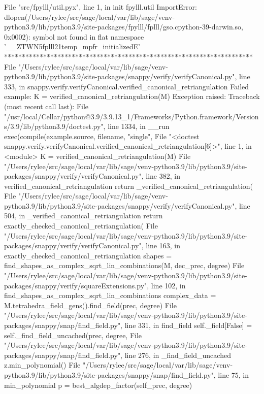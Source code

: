       File "src/fpylll/util.pyx", line 1, in init fpylll.util
    ImportError: dlopen(/Users/rylee/src/sage/local/var/lib/sage/venv-python3.9/lib/python3.9/site-packages/fpylll/fplll/gso.cpython-39-darwin.so, 0x0002): symbol not found in flat namespace '__ZTWN5fplll21temp_mpfr_initializedE'
**********************************************************************
File "/Users/rylee/src/sage/local/var/lib/sage/venv-python3.9/lib/python3.9/site-packages/snappy/verify/verifyCanonical.py", line 333, in snappy.verify.verifyCanonical.verified_canonical_retriangulation
Failed example:
    K = verified_canonical_retriangulation(M)
Exception raised:
    Traceback (most recent call last):
      File "/usr/local/Cellar/python@3.9/3.9.13_1/Frameworks/Python.framework/Versions/3.9/lib/python3.9/doctest.py", line 1334, in __run
        exec(compile(example.source, filename, "single",
      File "<doctest snappy.verify.verifyCanonical.verified_canonical_retriangulation[6]>", line 1, in <module>
        K = verified_canonical_retriangulation(M)
      File "/Users/rylee/src/sage/local/var/lib/sage/venv-python3.9/lib/python3.9/site-packages/snappy/verify/verifyCanonical.py", line 382, in verified_canonical_retriangulation
        return _verified_canonical_retriangulation(
      File "/Users/rylee/src/sage/local/var/lib/sage/venv-python3.9/lib/python3.9/site-packages/snappy/verify/verifyCanonical.py", line 504, in _verified_canonical_retriangulation
        return exactly_checked_canonical_retriangulation(
      File "/Users/rylee/src/sage/local/var/lib/sage/venv-python3.9/lib/python3.9/site-packages/snappy/verify/verifyCanonical.py", line 163, in exactly_checked_canonical_retriangulation
        shapes = find_shapes_as_complex_sqrt_lin_combinations(M, dec_prec, degree)
      File "/Users/rylee/src/sage/local/var/lib/sage/venv-python3.9/lib/python3.9/site-packages/snappy/verify/squareExtensions.py", line 102, in find_shapes_as_complex_sqrt_lin_combinations
        complex_data = M.tetrahedra_field_gens().find_field(prec, degree)
      File "/Users/rylee/src/sage/local/var/lib/sage/venv-python3.9/lib/python3.9/site-packages/snappy/snap/find_field.py", line 331, in find_field
        self._field[False] = self._find_field_uncached(prec, degree,
      File "/Users/rylee/src/sage/local/var/lib/sage/venv-python3.9/lib/python3.9/site-packages/snappy/snap/find_field.py", line 276, in _find_field_uncached
        z.min_polynomial()
      File "/Users/rylee/src/sage/local/var/lib/sage/venv-python3.9/lib/python3.9/site-packages/snappy/snap/find_field.py", line 75, in min_polynomial
        p = best_algdep_factor(self_prec, degree)
